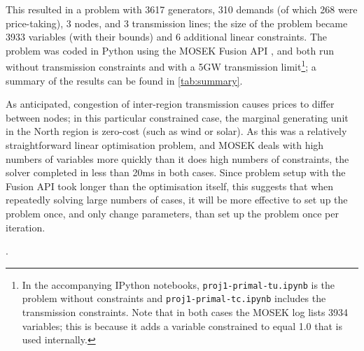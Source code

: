 \documentclass[11pt,a4paper]{article}
\begin{document}
This resulted in a problem with 3617 generators, 310 demands (of which 268 were price-taking), 3 nodes, and 3 transmission lines; the size of the problem became 3933 variables (with their bounds) and 6 additional linear constraints.
The problem was coded in Python using the MOSEK Fusion API \cite{mosekapsMOSEKFusionAPI2021}, and both run without transmission constraints and with a 5GW transmission limit\footnote{
In the accompanying IPython notebooks, \texttt{proj1-primal-tu.ipynb} is the problem without constraints and \texttt{proj1-primal-tc.ipynb} includes the transmission constraints.
Note that in both cases the MOSEK log lists 3934 variables; this is because it adds a variable constrained to equal 1.0 that is used internally.
}; a summary of the results can be found in \cref{tab:summary}.

\begin{table}[htbp]
    \centering

    \caption{Market clearing summary}
    \label{tab:summary}
\end{table}

As anticipated, congestion of inter-region transmission causes prices to differ between nodes; in this particular constrained case, the marginal generating unit in the North region is zero-cost (such as wind or solar).
As this was a relatively straightforward linear optimisation problem, and MOSEK deals with high numbers of variables more quickly than it does high numbers of constraints, the solver completed in less than 20ms in both cases.
Since problem setup with the Fusion API took longer than the optimisation itself, this suggests that when repeatedly solving large numbers of cases, it will be more effective to set up the problem once, and only change parameters, than set up the problem once per iteration.




\renewcommand{\refname}{\section{References}}.

\end{document}
